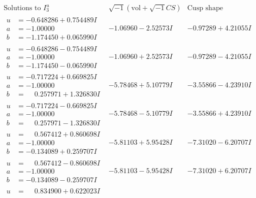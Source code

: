 \documentclass[1p]{elsarticle_modified}
\theoremstyle{definition}
\newcommand{\I}{\sqrt{-1}}
\begin{document}
$$\begin{array}{c|c|c}  
\text{Solutions to }I^u_{3}& \I (\text{vol} + \sqrt{-1}CS) & \text{Cusp shape}\\
 \hline 
\begin{aligned}
u &= -0.648286 + 0.754489 I \\
a &= -1.00000\phantom{ +0.000000I} \\
b &= -1.174450 + 0.065990 I\end{aligned}
 & -1.06960 - 2.52573 I & -0.97289 + 4.21055 I \\ \hline\begin{aligned}
u &= -0.648286 - 0.754489 I \\
a &= -1.00000\phantom{ +0.000000I} \\
b &= -1.174450 - 0.065990 I\end{aligned}
 & -1.06960 + 2.52573 I & -0.97289 - 4.21055 I \\ \hline\begin{aligned}
u &= -0.717224 + 0.669825 I \\
a &= -1.00000\phantom{ +0.000000I} \\
b &= \phantom{-}0.257971 + 1.326830 I\end{aligned}
 & -5.78468 + 5.10779 I & -3.55866 - 4.23910 I \\ \hline\begin{aligned}
u &= -0.717224 - 0.669825 I \\
a &= -1.00000\phantom{ +0.000000I} \\
b &= \phantom{-}0.257971 - 1.326830 I\end{aligned}
 & -5.78468 - 5.10779 I & -3.55866 + 4.23910 I \\ \hline\begin{aligned}
u &= \phantom{-}0.567412 + 0.860698 I \\
a &= -1.00000\phantom{ +0.000000I} \\
b &= -0.134089 + 0.259707 I\end{aligned}
 & -5.81103 + 5.95428 I & -7.31020 - 6.20707 I \\ \hline\begin{aligned}
u &= \phantom{-}0.567412 - 0.860698 I \\
a &= -1.00000\phantom{ +0.000000I} \\
b &= -0.134089 - 0.259707 I\end{aligned}
 & -5.81103 - 5.95428 I & -7.31020 + 6.20707 I \\ \hline\begin{aligned}
u &= \phantom{-}0.834900 + 0.622023 I \\

\end{aligned}
\end{array}$$
\end{document}

